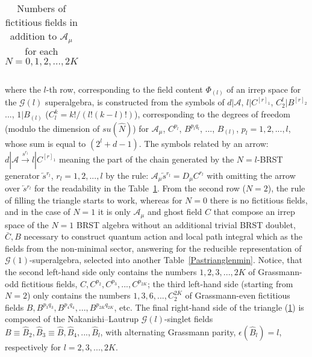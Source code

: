 \documentclass[10pt]{article}
\begin{document}
\begin{table}
\begin{center}
{\begin{tabular}{ccccccccc ccccccccc}
\end{tabular}}
\end{center}
 \caption{Numbers of fictitious fields in addition to $\mathcal{A}_\mu$ for each $N=0,1,2,...,2K$} \label{Pastriangle}
\end{table}
where the  $l$-th row, corresponding to the field content $\Phi_{(l)}$ of an irrep space
for the $\mathcal{G}(l)$ superalgebra, is constructed from the symbols
of $d|\mathcal{A}$, $l|C^{[r]_1}$, $C^l_2|B^{[r]_2}$..., $1|B_{(l)}$ ($C^k_l= k!/(l!(k-l)!)$), corresponding
to the degrees of freedom (modulo the dimension of $su(\hat{N})$) for $\mathcal{A}_\mu$,
$C^{p_l}$,  $B^{p_lq_l}$, ..., ${B}_{(l)}$, $p_l=1,2,...,l$, whose sum is equal
to  $(2^l+d-1)$. The symbols related by an arrow: $d|\mathcal{A}\stackrel{s{}^{r_l}}{\to} l|C^{[r]_1}$ meaning the part of the chain generated  by the $N=l$-BRST generator $\overleftarrow{s}{}^{r_l}$, $r_l=1,2,...,l$ by the rule: $\mathcal{A}_\mu \overleftarrow{s}{}^{r_l} = D_\mu C^{r_l}$  with omitting the arrow over $\overleftarrow{s}{}^{r_l}$ for the readability in the Table~\ref{Pastriangle}. From the second row ($N=2$), the rule of filling the triangle starts
to work, whereas for $N=0$ there is no fictitious fields, and
in the case of $N=1$ it is only $\mathcal{A}_\mu$ and ghost field $C$ that compose
an irrep space of the $N=1$ BRST algebra without an additional trivial BRST doublet,
$\bar{C}, B$ necessary to construct quantum action and local path integral which as the fields from the non-minimal sector, answering for the reducible representation of $\mathcal{G}(1)$-superalgebra,  selected into another Table~\ref{Pastrianglenmin}.  Notice, that the second left-hand side only contains the numbers
$1, 2,3,...,2K$ of Grassmann-odd fictitious fields, $C, C^{p_2}, C^{p_3},...,C^{p_{2K}}$;
the third left-hand side (starting from $N=2$) only contains the numbers
$1, 3, 6,...,C_2^{2K}$ of Grassmann-even fictitious fields
$B,  B^{p_3q_3},B^{p_4q_4},...,B^{p_{2K}q_{2K}}$, etc. The final right-hand side
of the triangle (\ref{Pastriangle}) is composed of the Nakanishi--Lautrup
$\mathcal{G}(l)$-singlet fields $B\equiv \widehat{B}_2,
\widehat{B}_3\equiv \widehat{B}, \widehat{B}_4,...,\widehat{B}_l$,
with alternating Grassmann parity, $\epsilon(\widehat{B}_l)= l$,
respectively for  $l=2,3,...,{2K}$.
\end{document}
